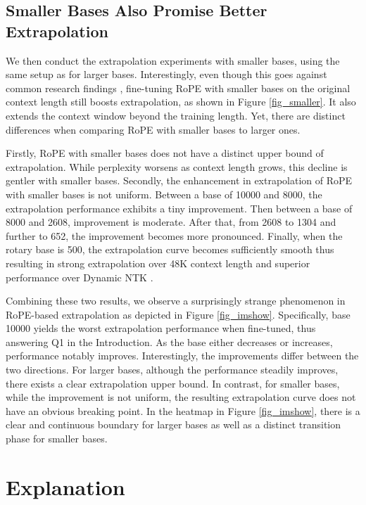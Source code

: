\subsection{Smaller Bases Also Promise Better Extrapolation}

We then conduct the extrapolation experiments with smaller bases, using the same setup as for larger bases. Interestingly, even though this goes against common research findings \citep{dynamicNTK,roziere2023code}, fine-tuning RoPE with smaller bases on the original context length still boosts extrapolation, as shown in Figure \ref{fig_smaller}. It also extends the context window beyond the training length. Yet, there are distinct differences when comparing RoPE with smaller bases to larger ones.

Firstly, RoPE with smaller bases does not have a distinct upper bound of extrapolation. While perplexity worsens as context length grows, this decline is gentler with smaller bases. Secondly, the enhancement in extrapolation of RoPE with smaller bases is not uniform. Between a base of 10000 and 8000, the extrapolation performance exhibits a tiny improvement. Then between a base of 8000 and 2608, improvement is moderate. After that, from 2608 to 1304 and further to 652, the improvement becomes more pronounced. Finally, when the rotary base is 500, the extrapolation curve becomes sufficiently smooth thus resulting in strong extrapolation over 48K context length and superior performance over Dynamic NTK \citep{dynamicNTK}.

Combining these two results, we observe a surprisingly strange phenomenon in RoPE-based extrapolation as depicted in Figure \ref{fig_imshow}. Specifically, base 10000 yields the worst extrapolation performance when fine-tuned, thus answering Q1 in the Introduction. As the base either decreases or increases, performance notably improves. Interestingly, the improvements differ between the two directions. For larger bases, although the performance steadily improves, there exists a clear extrapolation upper bound. In contrast, for smaller bases, while the improvement is not uniform, the resulting extrapolation curve does not have an obvious breaking point. In the heatmap in Figure \ref{fig_imshow}, there is a clear and continuous boundary for larger bases as well as a distinct transition phase for smaller bases.

\section{Explanation}

